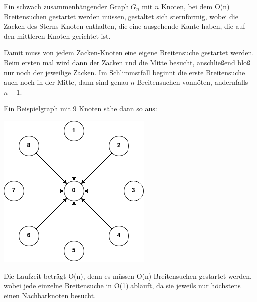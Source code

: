 \newpage
\begin{aufgabe}
\begin{teile}
	\item
	Ein schwach zusammenhängender Graph $G_n$ mit $n$ Knoten, bei dem O(n) Breitensuchen gestartet werden müssen, gestaltet sich sternförmig, wobei die Zacken des Sterns Knoten enthalten, die eine ausgehende Kante haben, die auf den mittleren Knoten gerichtet ist. 

	Damit muss von jedem Zacken-Knoten eine eigene Breitensuche gestartet werden. Beim ersten mal wird dann der Zacken und die Mitte besucht, anschließend bloß nur noch der jeweilige Zacken. Im Schlimmstfall beginnt die erste Breitensuche auch noch in der Mitte, dann sind genau $n$ Breitensuchen vonnöten, andernfalls $n-1$.

	Ein Beispielgraph mit 9 Knoten sähe dann so aus: 

\begin{center}
\includegraphics[scale=0.7]{Graph}
\end{center}

	\item
	Die Laufzeit beträgt O(n), denn es müssen O(n) Breitensuchen gestartet werden, wobei jede einzelne Breitensuche in O(1) abläuft, da sie jeweils nur höchstens einen Nachbarknoten besucht. 	
	
\end{teile}
\end{aufgabe}

